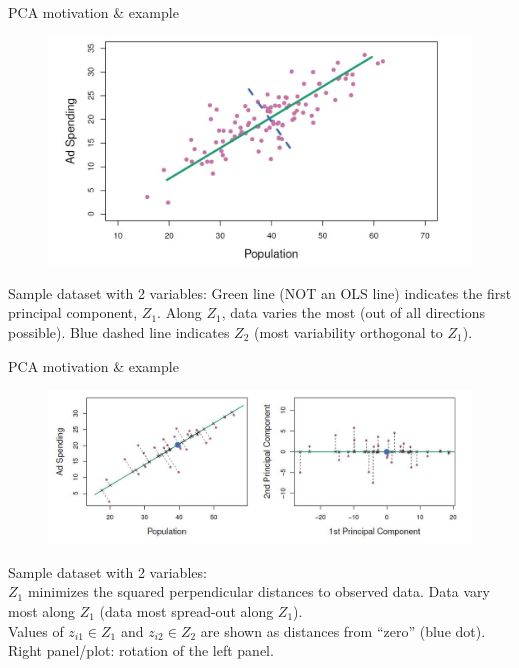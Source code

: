\documentclass{beamer}
\begin{document}
\begin{frame}{PCA motivation \& example}
\vspace{-0.3cm}
\begin{figure}
\includegraphics[scale=0.30]{IMG/PCAexample.jpg}
\end{figure}
\vspace{-0.3cm}
\centering Sample dataset with 2 variables: Green line (NOT an OLS line) indicates the first principal component, $Z_1$. Along $Z_1$, data varies the most (out of all directions possible). Blue dashed line indicates $Z_2$ (most variability orthogonal to $Z_1$).
\end{frame}
\begin{frame}{PCA motivation \& example}
\vspace{-1.0cm}
\begin{figure}
\includegraphics[scale=0.42]{IMG/PCAexample2.jpg}
\end{figure}
\vspace{-0.1cm}
\centering Sample dataset with 2 variables:  \\$Z_1$ minimizes the squared perpendicular distances to observed data. Data vary most along $Z_1$ (data most spread-out along $Z_1$). \\Values of $z_{i1} \in Z_1$ and $z_{i2} \in Z_2$ are shown as distances from ``zero'' (blue dot). Right panel/plot: rotation of the left panel.
\end{frame}
\end{document}
